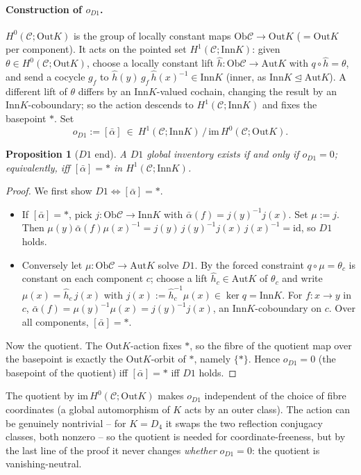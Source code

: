\documentclass[11pt]{article}
\newtheorem{proposition}[theorem]{Proposition}
\theoremstyle{definition}
\newcommand{\C}{\mathcal{C}}
\newcommand{\Ob}{\mathrm{Ob}}
\newcommand{\id}{\mathrm{id}}
\newcommand{\Aut}{\mathrm{Aut}}
\newcommand{\Inn}{\mathrm{Inn}}
\newcommand{\Out}{\mathrm{Out}}
\newcommand{\abar}{\bar{\alpha}}
\begin{document}
\paragraph{Construction of $o_{D1}$.} $H^0(\C;\Out K)$ is the group of locally constant
maps $\Ob\C\to\Out K$ ($=\Out K$ per component). It acts on the pointed set
$H^1(\C;\Inn K)$: given $\theta\in H^0(\C;\Out K)$, choose a locally constant lift $\hat
h\colon\Ob\C\to\Aut K$ with $q\circ\hat h=\theta$, and send a cocycle $g_f$ to $\hat
h(y)\,g_f\,\hat h(x)^{-1}\in\Inn K$ (inner, as $\Inn K\trianglelefteq\Aut K$). A different
lift of $\theta$ differs by an $\Inn K$-valued cochain, changing the result by an $\Inn
K$-coboundary; so the action descends to $H^1(\C;\Inn K)$ and fixes the basepoint $*$. Set
\[
o_{D1}:=[\abar]\ \in\ H^1(\C;\Inn K)\,/\,\mathrm{im}\,H^0(\C;\Out K).
\]

\begin{proposition}[$D1$ end]\label{prop:d1}
A $D1$ global inventory exists if and only if $o_{D1}=0$; equivalently, iff $[\abar]=*$ in
$H^1(\C;\Inn K)$.
\end{proposition}

\begin{proof}
We first show $D1\iff[\abar]=*$.
\begin{itemize}
\item If $[\abar]=*$, pick $j\colon\Ob\C\to\Inn K$ with $\abar(f)=j(y)^{-1}j(x)$. Set
$\mu:=j$. Then $\mu(y)\abar(f)\mu(x)^{-1}=j(y)\,j(y)^{-1}j(x)\,j(x)^{-1}=\id$, so $D1$ holds.
\item Conversely let $\mu\colon\Ob\C\to\Aut K$ solve $D1$. By the forced constraint
$q\circ\mu=\theta_c$ is constant on each component $c$; choose a lift $\hat h_c\in\Aut K$ of
$\theta_c$ and write $\mu(x)=\hat h_c\,j(x)$ with $j(x):=\hat h_c^{-1}\mu(x)\in\ker q=\Inn
K$. For $f\colon x\to y$ in $c$, $\abar(f)=\mu(y)^{-1}\mu(x)=j(y)^{-1}j(x)$, an $\Inn
K$-coboundary on $c$. Over all components, $[\abar]=*$.
\end{itemize}
Now the quotient. The $\Out K$-action fixes $*$, so the fibre of the quotient map over the
basepoint is exactly the $\Out K$-orbit of $*$, namely $\{*\}$. Hence $o_{D1}=0$ (the
basepoint of the quotient) iff $[\abar]=*$ iff $D1$ holds.
\end{proof}

The quotient by $\mathrm{im}\,H^0(\C;\Out K)$ makes $o_{D1}$ independent of the choice of
fibre coordinates (a global automorphism of $K$ acts by an outer class). The action can be
genuinely nontrivial -- for $K=D_4$ it swaps the two reflection conjugacy classes, both
nonzero -- so the quotient is needed for coordinate-freeness, but by the last line of the
proof it never changes \emph{whether} $o_{D1}=0$: the quotient is vanishing-neutral.
\end{document}
